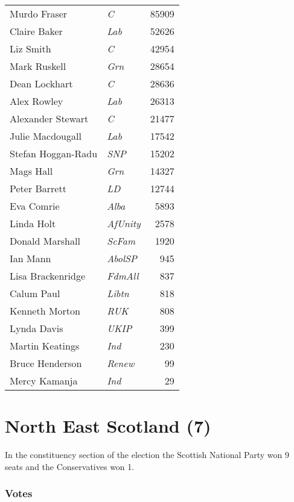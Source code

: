 {\footnotesize
\begin{tabular*}{\columnwidth}{@{\extracolsep{\fill}} p{} >{\itshape}l r @{\extracolsep{\fill}}}
	Murdo Fraser & C & 85909\\%
	Claire Baker & Lab & 52626\\%
	Liz Smith & C & 42954\\%
	Mark Ruskell & Grn & 28654\\%
	Dean Lockhart & C & 28636\\%
	Alex Rowley & Lab & 26313\\%
	Alexander Stewart & C & 21477\\%
	\hline
	Julie Macdougall & Lab & 17542\\
	Stefan Hoggan-Radu & SNP & 15202\\
	Mags Hall & Grn & 14327\\
	Peter Barrett & LD & 12744\\
	Eva Comrie & Alba & 5893\\
	Linda Holt & AfUnity & 2578\\
	Donald Marshall & ScFam & 1920\\
	Ian Mann & AbolSP & 945\\
	Lisa Brackenridge & FdmAll & 837\\
	Calum Paul & Libtn & 818\\
	Kenneth Morton & RUK & 808\\
	Lynda Davis & UKIP & 399\\
	Martin Keatings & Ind & 230\\
	Bruce Henderson & Renew & 99\\
	Mercy Kamanja & Ind & 29\\
\end{tabular*}
	
}

\section[North East Scotland]{North East Scotland (7)}

In the constituency section of the election the Scottish National Party won 9 seats and the Conservatives won 1.

\subsubsection*{Votes}

